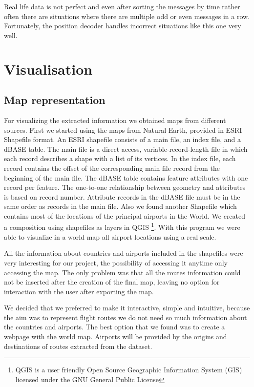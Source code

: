 \documentclass{vldb}
\begin{document}
Real life data is not perfect and even after sorting the messages by time rather often there are 
situations where there are multiple odd or even messages in a row. Fortunately, 
the position decoder handles incorrect situations like this one very well. \cite{salas:calculus} 

\section{Visualisation}

\subsection{Map representation}
For visualizing the extracted information we obtained maps from different sources. 
First we started using the maps from Natural Earth, provided in ESRI Shapefile format.
An ESRI shapefile consists of a main file, an index file, and a dBASE table.  The main
file is a direct access, variable-record-length file in which each record describes a shape
with a list of its vertices.  In the index file, each record contains the offset of the
corresponding main file record from the beginning of the main file.  The dBASE table
contains feature attributes with one record per feature.  The one-to-one relationship
between geometry and attributes is based on record number.  Attribute records in the
dBASE file must be in the same order as records in the main file.
Also we found another Shapefile 
which contains most of the locations of the principal airports in the World. We created a 
composition using shapefiles as layers in QGIS \footnote{QGIS is a user friendly Open Source 
Geographic Information System (GIS) licensed under the GNU General Public License}. 
With this program we were able to visualize in a 
world map all airport locations using a real scale.

All the information about countries and airports included in the shapefiles were very interesting 
for our project, the possibility of accessing it anytime only accessing the map. 
The only problem was that all the routes information could not be inserted after the creation of the 
final map, leaving no option for interaction with the user after exporting the map.

We decided that we preferred to make it interactive, simple and intuitive, because the aim was to 
represent flight routes we do not need so much information about the countries and airports. 
The best option that we found was to create a webpage with the world map. 
Airports will be provided by the origins and destinations of routes extracted from the dataset.
\end{document}
